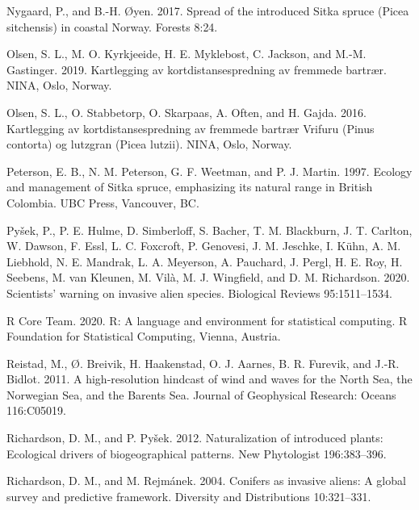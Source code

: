\documentclass[
]{article}
\begin{document}
\leavevmode\hypertarget{ref-nygaardSpreadIntroducedSitka2017}{}%
Nygaard, P., and B.-H. Øyen. 2017. Spread of the introduced Sitka spruce (Picea sitchensis) in coastal Norway. Forests 8:24.

\leavevmode\hypertarget{ref-olsenKartleggingAvKortdistansespredning2019}{}%
Olsen, S. L., M. O. Kyrkjeeide, H. E. Myklebost, C. Jackson, and M.-M. Gastinger. 2019. Kartlegging av kortdistansespredning av fremmede bartrær. NINA, Oslo, Norway.

\leavevmode\hypertarget{ref-olsenKartleggingAvKortdistansespredning2016}{}%
Olsen, S. L., O. Stabbetorp, O. Skarpaas, A. Often, and H. Gajda. 2016. Kartlegging av kortdistansespredning av fremmede bartrær Vrifuru (Pinus contorta) og lutzgran (Picea lutzii). NINA, Oslo, Norway.

\leavevmode\hypertarget{ref-petersonEcologyManagementSitka1997}{}%
Peterson, E. B., N. M. Peterson, G. F. Weetman, and P. J. Martin. 1997. Ecology and management of Sitka spruce, emphasizing its natural range in British Colombia. UBC Press, Vancouver, BC.

\leavevmode\hypertarget{ref-pysekScientistsWarningInvasive2020}{}%
Pyšek, P., P. E. Hulme, D. Simberloff, S. Bacher, T. M. Blackburn, J. T. Carlton, W. Dawson, F. Essl, L. C. Foxcroft, P. Genovesi, J. M. Jeschke, I. Kühn, A. M. Liebhold, N. E. Mandrak, L. A. Meyerson, A. Pauchard, J. Pergl, H. E. Roy, H. Seebens, M. van Kleunen, M. Vilà, M. J. Wingfield, and D. M. Richardson. 2020. Scientists' warning on invasive alien species. Biological Reviews 95:1511--1534.

\leavevmode\hypertarget{ref-rcoreteamLanguageEnvironmentStatistical2020}{}%
R Core Team. 2020. R: A language and environment for statistical computing. R Foundation for Statistical Computing, Vienna, Austria.

\leavevmode\hypertarget{ref-reistadHighresolutionHindcastWind2011}{}%
Reistad, M., Ø. Breivik, H. Haakenstad, O. J. Aarnes, B. R. Furevik, and J.-R. Bidlot. 2011. A high-resolution hindcast of wind and waves for the North Sea, the Norwegian Sea, and the Barents Sea. Journal of Geophysical Research: Oceans 116:C05019.

\leavevmode\hypertarget{ref-richardsonNaturalizationIntroducedPlants2012}{}%
Richardson, D. M., and P. Pyšek. 2012. Naturalization of introduced plants: Ecological drivers of biogeographical patterns. New Phytologist 196:383--396.

\leavevmode\hypertarget{ref-richardsonConifersInvasiveAliens2004}{}%
Richardson, D. M., and M. Rejmánek. 2004. Conifers as invasive aliens: A global survey and predictive framework. Diversity and Distributions 10:321--331.
\end{document}
